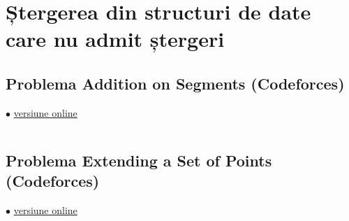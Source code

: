 \documentclass[../main.tex]{subfiles}
\begin{document}
\chapter{Ștergerea din structuri de date care nu admit ștergeri}

\section{Problema Addition on Segments (Codeforces)}
\label{code:addition-on-segments}
$\bullet$
\href{https://codeforces.com/contest/981/submission/282784764}{versiune online}

\inputminted{cpp}{../src/segment-trees/addition-on-segments.cpp}

\section{Problema Extending a Set of Points (Codeforces)}
\label{code:extending-a-set-of-points}
$\bullet$
\href{https://codeforces.com/contest/1140/submission/342282679}{versiune online}

\inputminted{cpp}{../src/segment-trees/extending-a-set-of-points.cpp}
\end{document}
